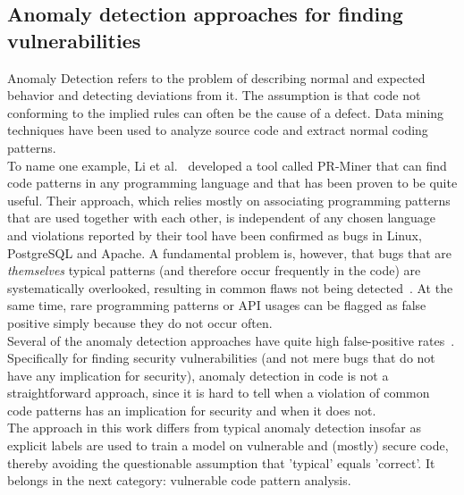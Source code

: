 \documentclass[
a4paper,
pagesize,
pdftex,
12pt,
twoside, %
BCOR=5mm, %
ngerman,
fleqn,
final,
]{scrartcl}
\begin{document}
	\subsection{Anomaly detection approaches for finding vulnerabilities}
	Anomaly Detection refers to the problem of describing normal and expected behavior and detecting deviations from it. The assumption is that code not conforming to the implied rules can often be the cause of a defect. Data mining techniques have been used to analyze source code and extract normal coding patterns.\\
	To name one example, Li et al.~\cite{Li.2005} developed a tool called PR-Miner that can find code patterns in any programming language and that has been proven to be quite useful. Their approach, which relies mostly on associating programming patterns that are used together with each other, is independent of any chosen language and violations reported by their tool have been confirmed as bugs in Linux, PostgreSQL and Apache. A fundamental problem is, however, that bugs that are \textit{themselves} typical patterns (and therefore occur frequently in the code) are systematically overlooked, resulting in common flaws not being detected~\cite{Yamaguchi.2012}. At the same time, rare programming patterns or API usages can be flagged as false positive simply because they do not occur often.\\
	Several of the anomaly detection approaches have quite high false-positive rates~\cite{Ghaffarian.2017}. Specifically for finding security vulnerabilities (and not mere bugs that do not have any implication for security), anomaly detection in code is not a straightforward approach, since it is hard to tell when a violation of common code patterns has an implication for security and when it does not.\\
	The approach in this work differs from typical anomaly detection insofar as explicit labels are used to train a model on vulnerable and (mostly) secure code, thereby avoiding the questionable assumption that 'typical' equals 'correct'. It belongs in the next category: vulnerable code pattern analysis. 
	
\end{document}
